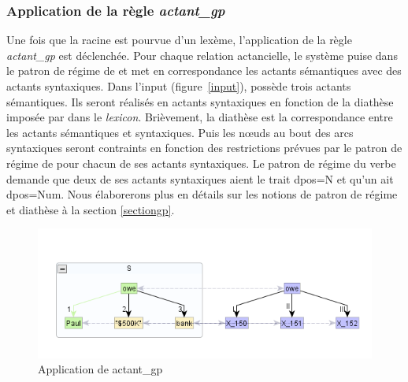 \subsubsection{Application de la règle \emph{actant\_gp}}
Une fois que la racine est pourvue d'un lexème, l'application de la règle \emph{actant\_gp} est déclenchée. Pour chaque relation actancielle, le système puise dans le patron de régime de  et met en correspondance les actants sémantiques avec des actants syntaxiques. Dans l'input (figure~\ref{input}),  possède trois actants sémantiques. Ils seront réalisés en actants syntaxiques en fonction de la diathèse imposée par  dans le \emph{lexicon}. Brièvement, la diathèse est la correspondance entre les actants sémantiques et syntaxiques. Puis les n\oe{}uds au bout des arcs syntaxiques seront contraints en fonction des restrictions prévues par le patron de régime de  pour chacun de ses actants syntaxiques. Le patron de régime du verbe demande que deux de ses actants syntaxiques aient le trait dpos=N et qu'un ait dpos=Num. Nous élaborerons plus en détails sur les notions de patron de régime et diathèse à la section \ref{sectiongp}. 

\begin{figure}[htb]
	\centering
	\includegraphics[width=1\textwidth, trim = {0cm 8mm 0cm 15mm},clip]{ch3/figs/actant_gp1.png}
	\caption{Application de actant\_gp}
	\label{fig:actantgp}
\end{figure}

\subsubsection{}

